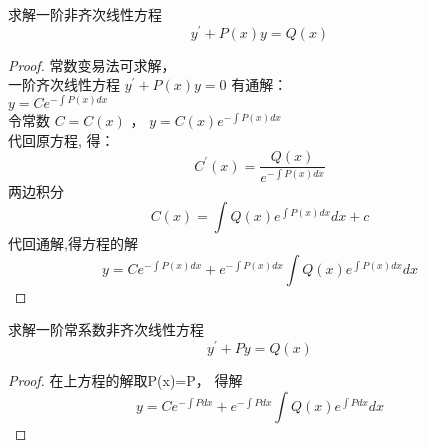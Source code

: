 \begin{example} %
	求解一阶非齐次线性方程
	\begin{equation*}
		y^{\prime}+P(x) y=Q(x)
	\end{equation*}	
	\begin{proof} 常数变易法可求解，\\
	一阶齐次线性方程 $ y^{\prime}+P(x) y=0$  有通解：\\ \vspace{0.3cm}
		{\large 	$y=Ce^{-\int P(x)dx}$}\\	\vspace{0.3cm}
		令常数 $C=C(x)$ ，	{\large 	$y=C(x)e^{-\int P(x)dx}$} \\ \vspace{0.3cm}
		代回原方程, 得：
\begin{equation*}
	C^{\prime}(x)=\frac {Q(x)} {e^{-\int P(x)dx}}
	\end{equation*}	
	两边积分
	\begin{equation*}
		C(x)=\int Q(x)e^{\int P(x)dx} dx+c 
	\end{equation*}	
	代回通解,得方程的解
	\begin{equation*}
		y=Ce^{-\int P(x)dx}+e^{-\int P(x)dx}\int Q(x)e^{\int P(x)dx} dx
	\end{equation*}	
	\end{proof}
\end{example}

\begin{example} %
	求解一阶常系数非齐次线性方程
	\begin{equation*}
		y^{\prime}+Py=Q(x)
	\end{equation*}	
	\begin{proof} 在上方程的解取P(x)=P， 得解
		\begin{equation*}
			y=Ce^{-\int Pdx}+e^{-\int Pdx}\int Q(x)e^{\int Pdx} dx
		\end{equation*}	
	\end{proof}
\end{example}

